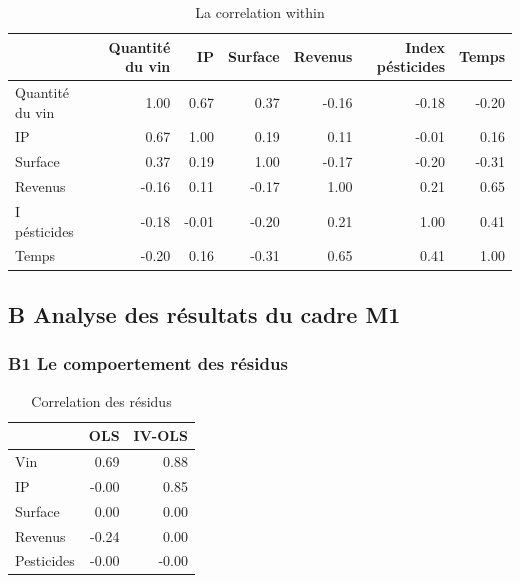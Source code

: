 \documentclass[11pt,]{article}
\begin{document}
\begin{table}[ht]
\centering
\begin{tabular}{l|rrrrrr}
  \hline
 & Quantité du vin & IP & Surface & Revenus & Index pésticides & Temps \\ 
  \hline
Quantité du vin & 1.00 & 0.67 & 0.37 & -0.16 & -0.18 & -0.20 \\ 
  IP & 0.67 & 1.00 & 0.19 & 0.11 & -0.01 & 0.16 \\ 
  Surface & 0.37 & 0.19 & 1.00 & -0.17 & -0.20 & -0.31 \\ 
  Revenus & -0.16 & 0.11 & -0.17 & 1.00 & 0.21 & 0.65 \\ 
  I pésticides & -0.18 & -0.01 & -0.20 & 0.21 & 1.00 & 0.41 \\ 
  Temps & -0.20 & 0.16 & -0.31 & 0.65 & 0.41 & 1.00 \\ 
   \hline
\end{tabular}
\caption{La correlation within} 
\end{table}

\FloatBarrier

\newpage

\hypertarget{b-analyse-des-resultats-du-cadre-m1}{%
\subsection{B Analyse des résultats du cadre
M1}\label{b-analyse-des-resultats-du-cadre-m1}}

\hypertarget{b1-le-compoertement-des-residus}{%
\subsubsection{B1 Le compoertement des
résidus}\label{b1-le-compoertement-des-residus}}

\FloatBarrier

\begin{table}[ht]
\centering
\begin{tabular}{l|rr}
  \hline
 & OLS & IV-OLS \\ 
  \hline
Vin & 0.69 & 0.88 \\ 
  IP & -0.00 & 0.85 \\ 
  Surface & 0.00 & 0.00 \\ 
  Revenus & -0.24 & 0.00 \\ 
  Pesticides & -0.00 & -0.00 \\ 
   \hline
\end{tabular}
\caption{Correlation des résidus} 
\end{table}
\end{document}
